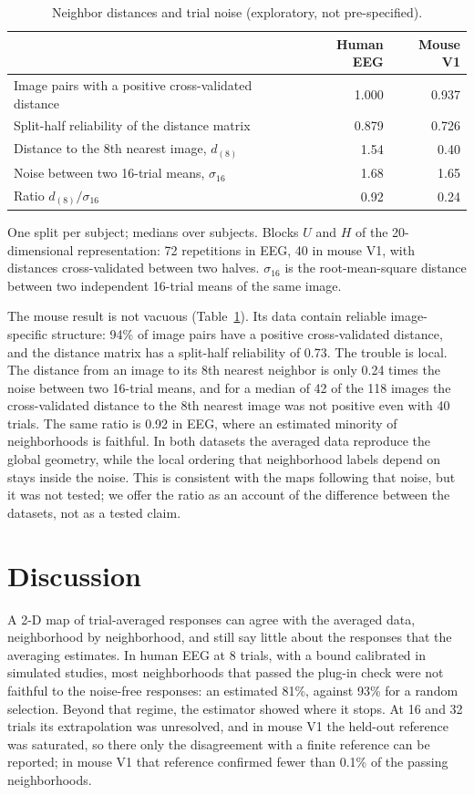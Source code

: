 \documentclass[11pt]{article}
\newcommand{\tablenote}[1]{\par\smallskip
  \begin{minipage}{\linewidth}\footnotesize\setlength{\parindent}{0pt}#1\end{minipage}}
\newcommand{\RatioEeg}{0.92}
\newcommand{\RatioMouse}{0.24}
\newcommand{\RelMouse}{0.73}
\newcommand{\PosMouse}{94}
\newcommand{\MouseNonPos}{42}
\newcommand{\EegFCeightSmaller}{81}
\newcommand{\EegRandEight}{93}
\begin{document}
\begin{table}[!htb]
\centering\small
\caption{Neighbor distances and trial noise (exploratory, not pre-specified).}
\label{tab:snr}
\begin{tabular}{lrr}
\toprule
 & Human EEG & Mouse V1 \\
\midrule
Image pairs with a positive cross-validated distance & 1.000 & 0.937 \\
Split-half reliability of the distance matrix & 0.879 & 0.726 \\
Distance to the 8th nearest image, $d_{(8)}$ & 1.54 & 0.40 \\
Noise between two 16-trial means, $\sigma_{16}$ & 1.68 & 1.65 \\
Ratio $d_{(8)}/\sigma_{16}$ & 0.92 & 0.24 \\
\bottomrule
\end{tabular}
\tablenote{One split per subject; medians over subjects.
Blocks $U$ and $H$ of the 20-dimensional representation: 72 repetitions in EEG, 40 in mouse V1, with distances cross-validated between two halves.
$\sigma_{16}$ is the root-mean-square distance between two independent 16-trial means of the same image.}
\end{table}

The mouse result is not vacuous (Table~\ref{tab:snr}).
Its data contain reliable image-specific structure: \PosMouse\% of image pairs have a positive cross-validated distance, and the distance matrix has a split-half reliability of \RelMouse.
The trouble is local.
The distance from an image to its 8th nearest neighbor is only \RatioMouse{} times the noise between two 16-trial means, and for a median of \MouseNonPos{} of the 118 images the cross-validated distance to the 8th nearest image was not positive even with 40 trials.
The same ratio is \RatioEeg{} in EEG, where an estimated minority of neighborhoods is faithful.
In both datasets the averaged data reproduce the global geometry, while the local ordering that neighborhood labels depend on stays inside the noise.
This is consistent with the maps following that noise, but it was not tested; we offer the ratio as an account of the difference between the datasets, not as a tested claim.

\section{Discussion}\label{sec:disc}

A 2-D map of trial-averaged responses can agree with the averaged data, neighborhood by neighborhood, and still say little about the responses that the averaging estimates.
In human EEG at 8 trials, with a bound calibrated in simulated studies, most neighborhoods that passed the plug-in check were not faithful to the noise-free responses: an estimated \EegFCeightSmaller\%, against \EegRandEight\% for a random selection.
Beyond that regime, the estimator showed where it stops.
At 16 and 32 trials its extrapolation was unresolved, and in mouse V1 the held-out reference was saturated, so there only the disagreement with a finite reference can be reported; in mouse V1 that reference confirmed fewer than 0.1\% of the passing neighborhoods.
\end{document}
